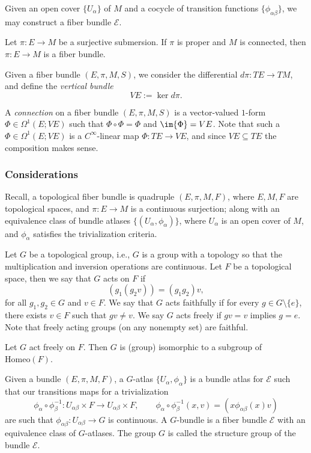 Given an open cover $\{U_\alpha\}$ of $M$ and a cocycle of transition functions $\{\phi_{\alpha\beta}\}$, we may construct a fiber bundle $\mathcal{E}$.

\begin{lem}
    Let $\pi:E\to M$ be a surjective submersion.  If $\pi$ is proper and $M$ is connected, then $\pi:E\to M$ is a fiber bundle.
\end{lem}

Given a fiber bundle $(E,\pi,M,S)$, we consider the differential $d\pi:TE\to TM$, and define the \textit{vertical bundle}
$$VE:=\ker{d\pi}.$$

A \textit{connection} on a fiber bundle $(E,\pi,M,S)$ is a vector-valued $1$-form $\Phi\in\Omega^1(E;VE)$ such that $\Phi\circ\Phi=\Phi$ and $\im{\Phi}=VE$.  Note that such a $\Phi\in\Omega^1(E;VE)$ is a $C^\infty$-linear map $\Phi:TE\to VE$, and since $VE\subseteq TE$ the composition makes sense.


\subsubsection{Considerations}

Recall, a topological fiber bundle is quadruple $(E,\pi,M,F)$, where $E,M,F$ are topological spaces, and $\pi:E\to M$ is a continuous surjection; along with an equivalence class of bundle atlases $\{(U_\alpha,\phi_\alpha)\}$, where $U_\alpha$ is an open cover of $M$, and $\phi_\alpha$ satisfies the trivialization criteria.

Let $G$ be a topological group, i.e., $G$ is a group with a topology so that the multiplication and inversion operations are continuous.  Let $F$ be a topological space, then we say that $G$ acts on $F$ if
$$(g_1(g_2v))=(g_1g_2)v,$$
for all $g_1,g_2\in G$ and $v\in F$.  We say that $G$ acts faithfully if for every $g\in G\setminus\{e\}$, there exists $v\in F$ such that $gv\neq v$.  We say $G$ acts freely if $gv=v$ implies $g=e$.  Note that freely acting groups (on any nonempty set) are faithful.

Let $G$ act freely on $F$.  Then $G$ is (group) isomorphic to a subgroup of $\text{Homeo}(F)$.

Given a bundle $(E,\pi,M,F)$, a $G$-atlas $\{U_\alpha,\phi_\alpha\}$ is a bundle atlas for $\mathcal{E}$ such that our transitions maps for a trivialization
$$\phi_\alpha\circ\phi_\beta^{-1}:U_{\alpha\beta}\times F\to U_{\alpha\beta}\times F,\qquad \phi_\alpha\circ\phi_\beta^{-1}(x,v)=(x\phi_{\alpha\beta}(x)v)$$
are such that $\phi_{\alpha\beta}:U_{\alpha\beta}\to G$ is continuous.  A $G$-bundle is a fiber bundle $\mathcal{E}$ with an equivalence class of $G$-atlases.  The group $G$ is called the structure group of the bundle $\mathcal{E}$.


